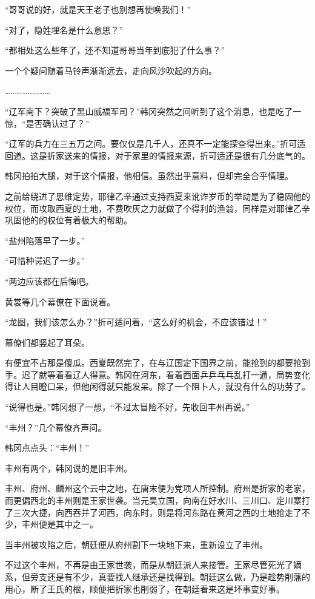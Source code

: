 “哥哥说的好，就是天王老子也别想再使唤我们！”

“对了，隐姓埋名是什么意思？”

“都相处这么些年了，还不知道哥哥当年到底犯了什么事？”

一个个疑问随着马铃声渐渐远去，走向风沙吹起的方向。

……………………

“辽军南下？突破了黑山威福军司？”韩冈突然之间听到了这个消息，也是吃了一惊，“是否确认过了？”

“辽军的兵力在三五万之间。要仅仅是几千人，还真不一定能探查得出来。”折可适回道。这是折家送来的情报，对于家里的情报来源，折可适还是很有几分底气的。

韩冈拍拍大腿，对于这个情报，他相信。虽然出乎意料，但却完全合乎情理。

之前给绕进了思维定势，耶律乙辛通过支持西夏来讹诈岁币的举动是为了稳固他的权位，而攻取西夏的土地，不费吹灰之力就做了个得利的渔翁，同样是对耶律乙辛巩固他的的权位有着极大的帮助。

“盐州陷落早了一步。”

“可惜种谔迟了一步。”

“两边应该都在后悔吧。

黄裳等几个幕僚在下面说着。

“龙图，我们该怎么办？”折可适问着，“这么好的机会，不应该错过！”

幕僚们都竖起了耳朵。

有便宜不占那是傻瓜。西夏既然完了，在与辽国定下国界之前，能抢到的都要抢到手。迟了就等着看辽人得意。韩冈在河东，看着西面乒乒乓乓乱打一通，局势变化得让人目瞪口呆，但他闲得就只能发呆。除了一个阻卜人，就没有什么的功劳了。

“说得也是。”韩冈想了一想，“不过太冒险不好，先收回丰州再说。”

“丰州？”几个幕僚齐声问。

韩冈点点头：“丰州！”

丰州有两个，韩冈说的是旧丰州。

丰州、府州、麟州这个云中之地，在唐末便为党项人所控制。府州是折家的老家，而更偏西北的丰州则是王家世袭。当元昊立国，向南在好水川、三川口、定川寨打了三次大捷，向西吞并了河西，向东时，则是将河东路在黄河之西的土地抢走了不少，丰州便是其中之一。

当丰州被攻陷之后，朝廷便从府州割下一块地下来，重新设立了丰州。

不过这个丰州，不再是由王家世袭，而是从朝廷派人来接管。王家尽管死光了嫡系，但旁支还是有不少，真要找人继承还是找得到。朝廷这么做，乃是趁势削藩的用心，断了王氏的根，顺便把折家也削弱了，在朝廷看来这是坏事变好事。

